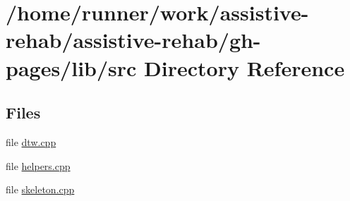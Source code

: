 \section{/home/runner/work/assistive-\/rehab/assistive-\/rehab/gh-\/pages/lib/src Directory Reference}
\label{dir_a065c5f60305fee3569f887679366939}
\subsection*{Files}
\begin{DoxyCompactItemize}
\item 
file \hyperlink{dtw_8cpp}{dtw.\+cpp}
\item 
file \hyperlink{helpers_8cpp}{helpers.\+cpp}
\item 
file \hyperlink{skeleton_8cpp}{skeleton.\+cpp}
\end{DoxyCompactItemize}
